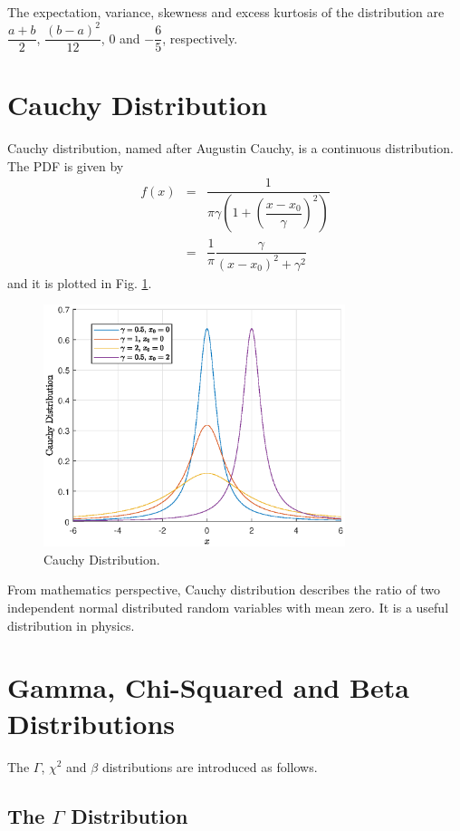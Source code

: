 The expectation, variance, skewness and excess kurtosis of the distribution are $\dfrac{a+b}{2}$, $\dfrac{(b-a)^2}{12}$, $0$ and $-\dfrac{6}{5}$, respectively.

\section{Cauchy Distribution}

Cauchy distribution, named after Augustin Cauchy, is a continuous distribution. The PDF is given by
\begin{eqnarray}
  f(x) &=& \dfrac{1}{\pi\gamma\left(1+\left(\dfrac{x-x_0}{\gamma}\right)^2\right)} \nonumber \\ &=& \dfrac{1}{\pi}\dfrac{\gamma}{(x-x_0)^2+\gamma^2} \nonumber
\end{eqnarray}
and it is plotted in Fig. \ref{fig:cauchy_pdf}.

\begin{figure}
	\centering
	\includegraphics[width=250pt]{chapters/ch-commonly-seen-distributions/figs/cauchy_pdf.eps}
	\caption{Cauchy Distribution.} \label{fig:cauchy_pdf}
\end{figure}

From mathematics perspective, Cauchy distribution describes the ratio of two independent normal distributed random variables with mean zero. It is a useful distribution in physics.

\section{Gamma, Chi-Squared and Beta Distributions}

The $\Gamma$, $\chi^2$ and $\beta$ distributions are introduced as follows.

\subsection{The $\Gamma$ Distribution}

